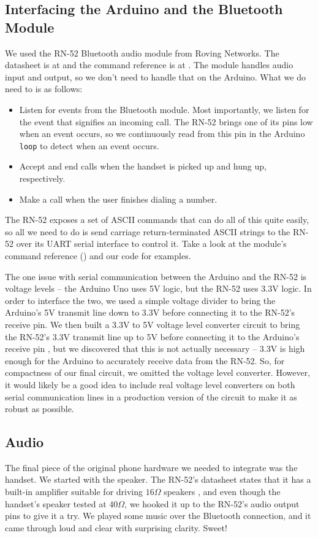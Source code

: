 \documentclass{es50report}
\begin{document}
    \subsection{Interfacing the Arduino and the Bluetooth Module}
    We used the RN-52 Bluetooth audio module from Roving Networks. The datasheet is at \cite{rn52Datasheet} and the command reference is at \cite{rn52CommandRef}. The module handles audio input and output, so we don't need to handle that on the Arduino. What we do need to is as follows:

    \begin{itemize}
        \item Listen for events from the Bluetooth module. Most importantly, we listen for the event that signifies an incoming call. The RN-52 brings one of its pins low when an event occurs, so we continuously read from this pin in the Arduino \verb+loop+ to detect when an event occurs.
        \item Accept and end calls when the handset is picked up and hung up, respectively.
        \item Make a call when the user finishes dialing a number.
    \end{itemize}

    The RN-52 exposes a set of ASCII commands that can do all of this quite easily, so all we need to do is send carriage return-terminated ASCII strings to the RN-52 over its UART serial interface to control it. Take a look at the module's command reference (\cite{rn52CommandRef}) and our code for examples.

    The one issue with serial communication between the Arduino and the RN-52 is voltage levels -- the Arduino Uno uses 5V logic, but the RN-52 uses 3.3V logic. In order to interface the two, we used a simple voltage divider to bring the Arduino's 5V transmit line down to 3.3V before connecting it to the RN-52's receive pin. We then built a 3.3V to 5V voltage level converter circuit to bring the RN-52's 3.3V transmit line up to 5V before connecting it to the Arduino's receive pin \cite{hobbytronics14}, but we discovered that this is not actually necessary -- 3.3V is high enough for the Arduino to accurately receive data from the RN-52. So, for compactness of our final circuit, we omitted the voltage level converter. However, it would likely be a good idea to include real voltage level converters on both serial communication lines in a production version of the circuit to make it as robust as possible.

    \subsection{Audio}
    The final piece of the original phone hardware we needed to integrate was the handset. We started with the speaker. The RN-52's datasheet states that it has a built-in amplifier suitable for driving $16\Omega$ speakers \cite{rn52Datasheet}, and even though the handset's speaker tested at $40\Omega$, we hooked it up to the RN-52's audio output pins to give it a try. We played some music over the Bluetooth connection, and it came through loud and clear with surprising clarity. Sweet!
\end{document}
